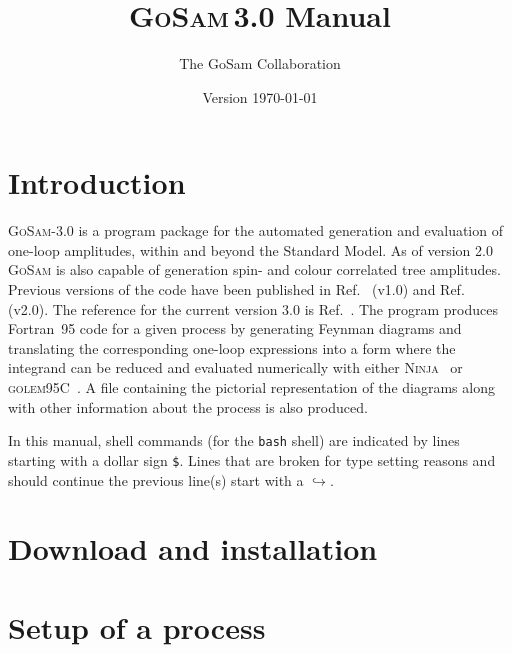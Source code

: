 \documentclass[11pt,a4paper, oneside]{scrbook}
\title{\textsc{GoSam}\,3.0 Manual}
\author{The GoSam Collaboration}
\date{Version \today}
\newcommand{\gosamversion}{{3{.}0}}
\newcommand{\gosam}{\textsc{GoSam}\xspace}
\newcommand{\gosamv}[1][\gosamversion]{\textsc{GoSam}-#1\xspace}
\newcommand{\golemVC}{\textsc{golem95C}\xspace}
\newcommand{\fortranXC}{Fortran~95\xspace}
\newcommand{\ninja}{\textsc{Ninja}\xspace}
\newcommand{\contl}{{\ensuremath{\hookrightarrow}}}
\begin{document}
\maketitle
\tableofcontents


\chapter{Introduction}
\gosamv is a program package for the automated generation and evaluation of one-loop amplitudes, within and beyond the Standard Model. As of version 2.0 \gosam is also capable of generation spin- and colour correlated tree amplitudes. Previous versions of the code have been published in Ref.~\cite{Cullen:2011ac} (v1.0) and Ref.~\cite{Cullen:2014yla} (v2.0). The reference for the current version 3.0 is Ref.~\cite{Braun:2025afl}. The program produces \fortranXC code for a given process
by generating Feynman diagrams and translating
the corresponding one-loop expressions into a form where the integrand
can be reduced and evaluated numerically with either
\ninja~\cite{Mastrolia:2012bu,vanDeurzen:2013saa,Peraro:2014cba}
or \golemVC~\cite{Binoth:2008uq,Cullen:2011kv,Guillet:2013msa}.
A file containing the pictorial representation of the diagrams along with other information 
about the process is also produced. 

\vspace*{3mm}

In this manual, shell commands 
(for the \texttt{bash} shell) are indicated
by lines starting with a dollar sign \texttt{\$}.
Lines that are broken for type setting reasons and should
continue the previous line(s) start with a \contl.

\chapter{Download and installation}


\chapter{Setup of a process}
\label{chp:setup-of-a-process}

\end{document}
